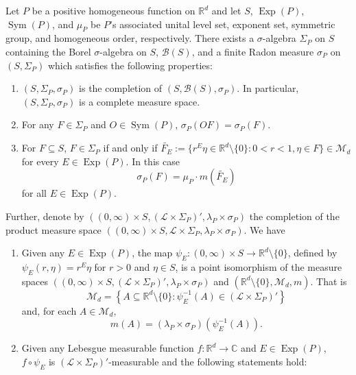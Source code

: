 \documentclass[smallextended]{svjour3}
\theoremstyle{remark}
\newcommand\Sym{\operatorname{Sym}}
\newcommand\Exp{\operatorname{Exp}}
\begin{document}
\begin{theorem}\label{thm:BestIntegrationFormula} Let $P$ be a positive homogeneous function on $\mathbb{R}^d$ and let $S$, $\Exp(P)$, $\Sym(P)$, and $\mu_P$ be $P$'s associated unital level set, exponent set, symmetric group, and homogeneous order, respectively.
There exists a $\sigma$-algebra $\Sigma_P$ on $S$ containing the Borel $\sigma$-algebra on $S$, $\mathcal{B}(S)$,
and a finite Radon measure $\sigma_P$ on $(S,\Sigma_P)$ which satisfies the following properties:
\begin{enumerate}
\item\label{property:Completion} $(S,\Sigma_P,\sigma_P)$ is the completion of $(S,\mathcal{B}(S),\sigma_P)$. In particular, $(S,\Sigma_P,\sigma_P)$ is a complete measure space.
\item\label{property:Invariance} For any $F\in\Sigma_P$ and $O\in\Sym(P)$, $\sigma_P(OF)=\sigma_P(F)$.
\item\label{property:DefiningConditionofsigma} For $F\subseteq S$, $F\in\Sigma_P$ if and only if $\widetilde{F_E}:=\{r^E\eta\in\mathbb{R}^d\setminus\{0\}:0<r<1,\eta\in F\}\in\mathcal{M}_d$ for every $E\in \Exp(P)$. In this case
\begin{equation*}
    \sigma_P(F)=\mu_P\cdot m(\widetilde{F_E})
\end{equation*}
for all $E\in\Exp(P)$.
\end{enumerate}
Further, denote by $\left((0,\infty)\times S,(\mathcal{L}\times\Sigma_P)',\lambda_P\times\sigma_P\right)$ the completion of the product measure space $((0,\infty)\times S,\mathcal{L}\times\Sigma_P,\lambda_P\times\sigma_P)$. We have
\begin{enumerate}
\item\label{property:BestPointIsomorphism} Given any $E\in \Exp(P)$, the map $\psi_E:(0,\infty)\times S\to\mathbb{R}^d\setminus\{0\}$, defined by $\psi_E(r,\eta)=r^E\eta$ for $r>0$ and $\eta\in S$, is a point isomorphism of the measure spaces $\left((0,\infty)\times S,(\mathcal{L}\times\Sigma_P)',\lambda_P\times\sigma_P\right)$ and $(\mathbb{R}^d\setminus\{0\},\mathcal{M}_d,m)$. That is
\begin{equation*}
\mathcal{M}_d=\left\{A\subseteq \mathbb{R}^d\setminus\{0\}:\psi_E^{-1}(A)\in (\mathcal{L}\times\Sigma_P)'\right\}
\end{equation*}
and, for each $A\in\mathcal{M}_d$,
\begin{equation*}
m(A)=(\lambda_P\times\sigma_P)(\psi_E^{-1}(A)).
\end{equation*}
\item\label{property:BestIntegrationFormula} Given any Lebesgue measurable function $f:\mathbb{R}^d\to\mathbb{C}$ and $E\in \Exp(P)$, $f\circ \psi_E$ is $(\mathcal{L}\times\Sigma_P)'$-measurable and the following statements hold:

\end{enumerate}
\end{theorem}
\end{document}
